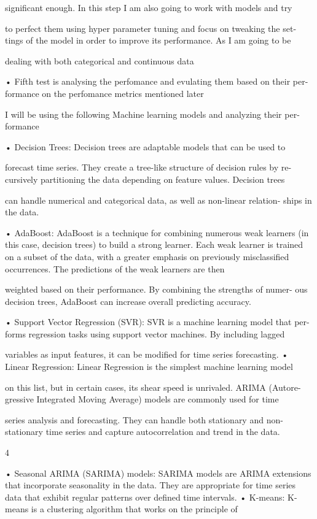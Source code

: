 \documentclass{imc-inf}
\begin{document}
significant enough. In this step I am also going to work with models and try

to perfect them using hyper parameter tuning and focus on tweaking the set-
tings of the model in order to improve its performance. As I am going to be

dealing with both categorical and continuous data

• Fifth test is analysing the perfomance and evulating them based on their per-
formance on the perfomance metrics mentioned later

I will be using the following Machine learning models and analyzing their per-
formance

• Decision Trees: Decision trees are adaptable models that can be used to

forecast time series. They create a tree-like structure of decision rules by re-
cursively partitioning the data depending on feature values. Decision trees

can handle numerical and categorical data, as well as non-linear relation-
ships in the data.

• AdaBoost: AdaBoost is a technique for combining numerous weak learners
(in this case, decision trees) to build a strong learner. Each weak learner
is trained on a subset of the data, with a greater emphasis on previously
misclassified occurrences. The predictions of the weak learners are then

weighted based on their performance. By combining the strengths of numer-
ous decision trees, AdaBoost can increase overall predicting accuracy.

• Support Vector Regression (SVR): SVR is a machine learning model that per-
forms regression tasks using support vector machines. By including lagged

variables as input features, it can be modified for time series forecasting.
• Linear Regression: Linear Regression is the simplest machine learning model

on this list, but in certain cases, its shear speed is unrivaled. ARIMA (Autore-
gressive Integrated Moving Average) models are commonly used for time

series analysis and forecasting. They can handle both stationary and non-
stationary time series and capture autocorrelation and trend in the data.

4

• Seasonal ARIMA (SARIMA) models: SARIMA models are ARIMA extensions
that incorporate seasonality in the data. They are appropriate for time series
data that exhibit regular patterns over defined time intervals.
• K-means: K-means is a clustering algorithm that works on the principle of
\end{document}
